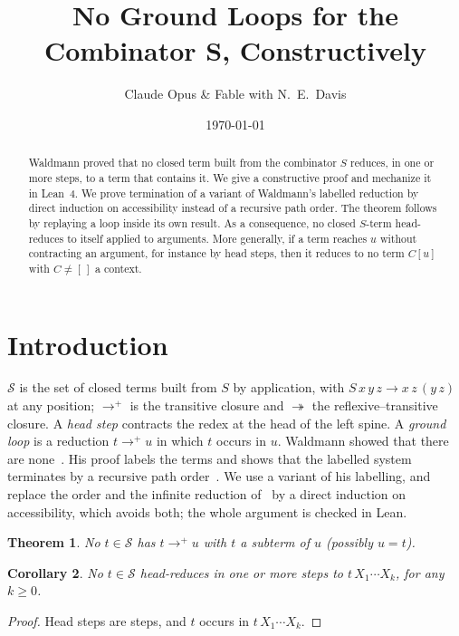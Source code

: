\documentclass[11pt]{amsart}
\title{No Ground Loops for the Combinator $\bm{S}$, Constructively}
\author{Claude Opus \& Fable with N.\ E.\ Davis}
\date{\today}
\newtheorem{theorem}{Theorem}
\newtheorem{corollary}[theorem]{Corollary}
\newcommand{\Ter}{\mathcal S}
\newcommand{\red}{\twoheadrightarrow}
\begin{document}
\begin{abstract}
Waldmann proved that no closed term built from the combinator $S$ reduces, in one or more steps,
to a term that contains it. We give a constructive proof and mechanize it in Lean~4. We
prove termination of a variant of Waldmann's labelled reduction by direct induction on accessibility instead
of a recursive path order. The theorem follows by replaying a loop inside its own result. As a consequence, no closed $S$-term head-reduces to itself applied to arguments. More generally, if a term reaches $u$ without contracting an argument, for instance by head steps, then it reduces to no term $C[u]$ with $C\ne[\,]$ a context.
\end{abstract}

\maketitle

\section{Introduction}

$\Ter$ is the set of closed terms built from $S$ by application, with $S\,x\,y\,z\to x\,z\,(y\,z)$ at
any position; $\to^+$ is the transitive closure and $\red$ the reflexive--transitive closure. A
\emph{head step} contracts the redex at the head of the left spine. A \emph{ground loop} is a reduction $t\to^+u$ in which $t$ occurs in $u$. Waldmann showed that
there are none~\citep[Cor.~17]{waldmann-ic}. His proof labels the terms and shows that the labelled
system terminates by a recursive path order~\citep[Thm.~8]{waldmann-ic}. We use a variant of his labelling,
and replace the order and the infinite reduction of~\citep[Cor.~17]{waldmann-ic} by a direct
induction on accessibility, which avoids both; the whole argument is checked in Lean.

\begin{theorem}\label{thm:main}
No $t\in\Ter$ has $t\to^+u$ with $t$ a subterm of $u$ (possibly $u=t$).
\end{theorem}

\begin{corollary}\label{cor:nhr}
No $t\in\Ter$ head-reduces in one or more steps to $t\,X_1\cdots X_k$, for any $k\ge0$.
\end{corollary}

\begin{proof}
Head steps are steps, and $t$ occurs in $t\,X_1\cdots X_k$.
\end{proof}
\end{document}
